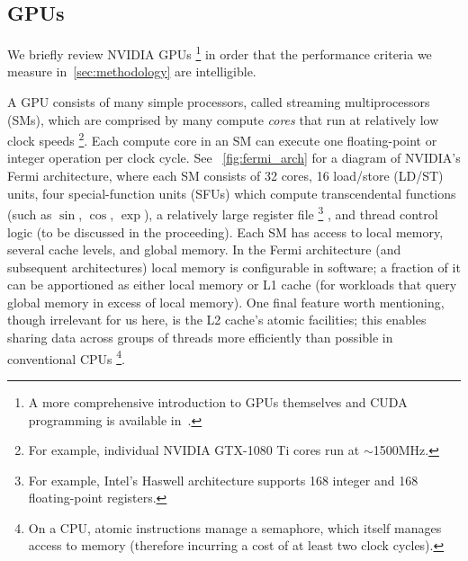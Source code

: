 \subsection{GPUs}\label{subsec:gpus}

We briefly review NVIDIA GPUs%
\footnote{A more comprehensive introduction to GPUs themselves and CUDA programming is available in~\cite{10.5555/1891996}.}
in order that the performance criteria we measure in~\cref{sec:methodology} are intelligible.

A GPU consists of many simple processors, called streaming multiprocessors (SMs), which are comprised by many compute \textit{cores} that run at relatively low clock speeds%
\footnote{For example, individual NVIDIA GTX-1080 Ti cores run at $\sim$1500MHz.}.
Each compute core in an SM can execute one floating-point or integer operation per clock cycle.
See ~\cref{fig:fermi_arch} for a diagram of NVIDIA's Fermi architecture, where each SM consists of 32 cores, 16 load/store (LD/ST) units, four special-function units (SFUs) which compute transcendental functions (such as $\sin$, $\cos$, $\exp$), a relatively large register file%
\footnote{For example, Intel's Haswell architecture supports 168 integer and 168 floating-point registers.}%
, and thread control logic (to be discussed in the proceeding).
Each SM has access to local memory, several cache levels, and global memory.
In the Fermi architecture (and subsequent architectures) local memory is configurable in software;
a fraction of it can be apportioned as either local memory or L1 cache (for workloads that query global memory in excess of local memory).
One final feature worth mentioning, though irrelevant for us here, is the L2 cache's atomic  facilities;
this enables sharing data across groups of threads more efficiently than possible in conventional CPUs%
\footnote{On a CPU, atomic  instructions manage a semaphore, which itself manages access to memory (therefore incurring a cost of at least two clock cycles).}.

